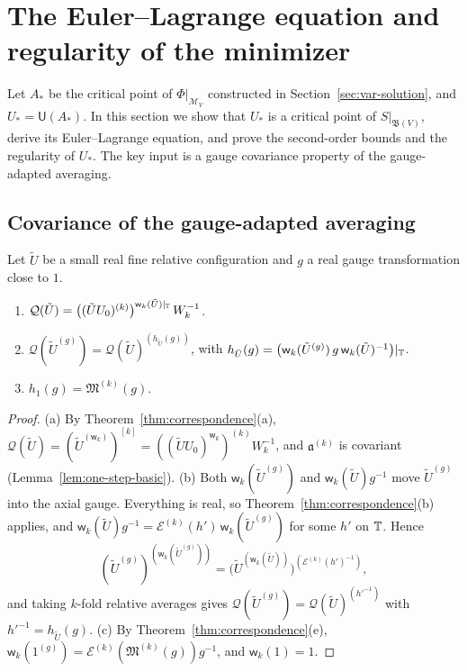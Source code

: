 \section{The Euler--Lagrange equation and regularity of the minimizer}\label{sec:var-regularity}

Let $A_*$ be the critical point of $\Phi|_{\mathcal M_V}$ constructed in Section~\ref{sec:var-solution}, and $U_*=\mathsf U(A_*)$. In this section we show that $U_*$ is a critical point of $S|_{\mathfrak B(V)}$, derive its Euler--Lagrange equation, and prove the second-order bounds and the regularity of $U_*$. The key input is a gauge covariance property of the gauge-adapted averaging.

\subsection{Covariance of the gauge-adapted averaging}

\begin{lemma}\label{lem:Q-covariance}
Let $\tilde U$ be a small real fine relative configuration and $g$ a real gauge transformation close to $1$.
\begin{enumerate}[label=(\alph*)]
\item $\mathcal Q(\tilde U)=\big((\tilde UU_0)^{(k)}\big)^{\mathsf w_k(\tilde U)|_\mathbb T}\,W_k^{-1}$.
\item $\mathcal Q(\tilde U^{(g)})=\mathcal Q(\tilde U)^{(h_{\tilde U}(g))}$, with $h_{\tilde U}(g)=\big(\mathsf w_k(\tilde U^{(g)})\,g\,\mathsf w_k(\tilde U)^{-1}\big)|_\mathbb T$.
\item $h_1(g)=\mathfrak M^{(k)}(g)$.
\end{enumerate}
\end{lemma}

\begin{proof}
(a) By Theorem~\ref{thm:correspondence}(a), $\mathcal Q(\tilde U)=(\tilde U^{(\mathsf w_k)})^{[k]}=((\tilde UU_0)^{\mathsf w_k})^{(k)}W_k^{-1}$, and $\mathfrak a^{(k)}$ is covariant (Lemma~\ref{lem:one-step-basic}). (b) Both $\mathsf w_k(\tilde U^{(g)})$ and $\mathsf w_k(\tilde U)g^{-1}$ move $\tilde U^{(g)}$ into the axial gauge. Everything is real, so Theorem~\ref{thm:correspondence}(b) applies, and $\mathsf w_k(\tilde U)g^{-1}=\mathcal E^{(k)}(h')\,\mathsf w_k(\tilde U^{(g)})$ for some $h'$ on $\mathbb T$. Hence
\[
(\tilde U^{(g)})^{(\mathsf w_k(\tilde U^{(g)}))}=\big(\tilde U^{(\mathsf w_k(\tilde U))}\big)^{(\mathcal E^{(k)}(h')^{-1})},
\]
and taking $k$-fold relative averages gives $\mathcal Q(\tilde U^{(g)})=\mathcal Q(\tilde U)^{(h'^{-1})}$ with $h'^{-1}=h_{\tilde U}(g)$. (c) By Theorem~\ref{thm:correspondence}(e), $\mathsf w_k(1^{(g)})=\mathcal E^{(k)}(\mathfrak M^{(k)}(g))g^{-1}$, and $\mathsf w_k(1)=1$.
\end{proof}

